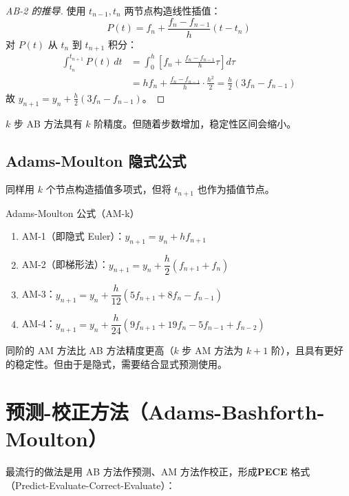 \begin{proof}[AB-2 的推导]
	使用 $t_{n-1}, t_n$ 两节点构造线性插值：
	\[
	P(t) = f_n + \frac{f_n - f_{n-1}}{h} (t - t_n)
	\]
	对 $P(t)$ 从 $t_n$ 到 $t_{n+1}$ 积分：
	\begin{align*}
		\int_{t_n}^{t_{n+1}} P(t) \, dt &= \int_{0}^{h} \left[ f_n + \frac{f_n - f_{n-1}}{h} \tau \right] d\tau \\
		&= h f_n + \frac{f_n - f_{n-1}}{h} \cdot \frac{h^2}{2} = \frac{h}{2} (3 f_n - f_{n-1})
	\end{align*}
	故 $y_{n+1} = y_n + \frac{h}{2}(3f_n - f_{n-1})$。
\end{proof}

\begin{remark}
	$k$ 步 AB 方法具有 $k$ 阶精度。但随着步数增加，稳定性区间会缩小。
\end{remark}

\subsection{Adams-Moulton 隐式公式}

同样用 $k$ 个节点构造插值多项式，但将 $t_{n+1}$ 也作为插值节点。

\begin{myTheorem}{Adams-Moulton 公式（AM-k）}
	\begin{enumerate}
		\item AM-1（即隐式 Euler）：$y_{n+1} = y_n + h f_{n+1}$
		\item AM-2（即梯形法）：$y_{n+1} = y_n + \dfrac{h}{2} (f_{n+1} + f_n)$
		\item AM-3：$y_{n+1} = y_n + \dfrac{h}{12} (5 f_{n+1} + 8 f_n - f_{n-1})$
		\item AM-4：$y_{n+1} = y_n + \dfrac{h}{24} (9 f_{n+1} + 19 f_n - 5 f_{n-1} + f_{n-2})$
	\end{enumerate}
\end{myTheorem}

\begin{remark}
	同阶的 AM 方法比 AB 方法精度更高（$k$ 步 AM 方法为 $k+1$ 阶），且具有更好的稳定性。但由于是隐式，需要结合显式预测使用。
\end{remark}

\section{预测-校正方法（Adams-Bashforth-Moulton）}

最流行的做法是用 AB 方法作预测、AM 方法作校正，形成\textbf{PECE} 格式（Predict-Evaluate-Correct-Evaluate）：

